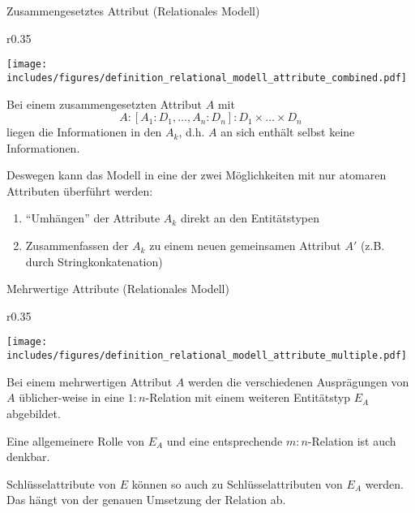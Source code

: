 \begin{defi}{Zusammengesetztes Attribut (Relationales Modell)}
    \begin{wrapfigure}{r}{0.35\textwidth}
        \begin{center}
            \texttt{[image: includes/figures/definition\_relational\_modell\_attribute\_combined.pdf]}
        \end{center}
    \end{wrapfigure}
    Bei einem zusammengesetzten Attribut $A$ mit
    \[
        A: [A_1 : D_1, \ldots, A_n:D_n]: D_1 \times \ldots \times D_n
    \]
    liegen die Informationen in den $A_k$, d.h. $A$ an sich enthält selbst keine Informationen.

    Deswegen kann das Modell in eine der zwei Möglichkeiten mit nur atomaren Attributen überführt werden:
    \begin{enumerate}
        \item \enquote{Umhängen} der Attribute $A_k$ direkt an den Entitätstypen
        \item Zusammenfassen der $A_k$ zu einem neuen gemeinsamen Attribut $A'$ (z.B. durch Stringkonkatenation)
    \end{enumerate}

    \vspace{6em}
\end{defi}

\begin{defi}{Mehrwertige Attribute (Relationales Modell)}
    \begin{wrapfigure}{r}{0.35\textwidth}
        \begin{center}
            \texttt{[image: includes/figures/definition\_relational\_modell\_attribute\_multiple.pdf]}
        \end{center}
    \end{wrapfigure}
    Bei einem mehrwertigen Attribut $A$ werden die verschiedenen Ausprägungen von $A$ üblicher-weise in eine $1:n$-Relation mit einem weiteren Entitätstyp $E_A$ abgebildet.

    Eine allgemeinere Rolle von $E_A$ und eine entsprechende $m:n$-Relation ist auch denkbar.

    Schlüsselattribute von $E$ können so auch zu Schlüsselattributen von $E_A$ werden.
    Das hängt von der genauen Umsetzung der Relation ab.

    \vspace{6em}
\end{defi}

